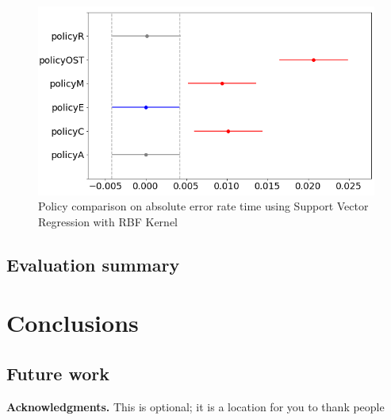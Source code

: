 \documentclass{mpaper}
\begin{document}
\begin{figure}[h]
    \centering
    \includegraphics[scale=0.35]{imgs/svr_rbf_R5_error_plot_diff_means.png}
    \caption{Policy comparison on absolute error rate time using Support Vector Regression with RBF Kernel}
    \label{fig:svr_rbf_R5_waiting_plot_diff_means}
\end{figure}

\subsection{Evaluation summary}

\section{Conclusions}

\subsection*{Future work}

{\bf Acknowledgments.}
This is optional; it is a location for you to thank people



\end{document}
